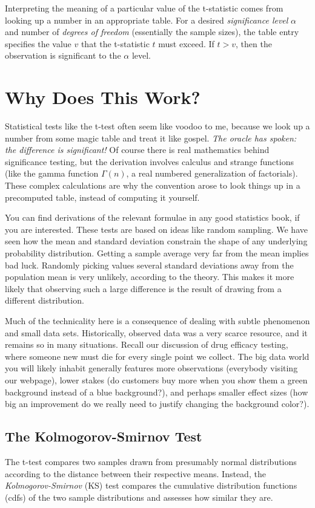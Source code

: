 \documentclass[10pt]{article}
\begin{document}
Interpreting the meaning of a particular value of the t-statistic comes from looking up a number in an appropriate table. For a desired \textit{significance level} $\alpha$ and number of \textit{degrees of freedom} (essentially the sample sizes), the table entry specifies the value $v$ that the t-statistic $t$ must exceed. If $t>v$, then the observation is significant to the $\alpha$ level.

\section{Why Does This Work?}
Statistical tests like the t-test often seem like voodoo to me, because we look up a number from some magic table and treat it like gospel. \textit{The oracle has spoken: the difference is significant!} Of course there is real mathematics behind significance testing, but the derivation involves calculus and strange functions (like the gamma function $\Gamma(n)$, a real numbered generalization of factorials). These complex calculations are why the convention arose to look things up in a precomputed table, instead of computing it yourself.

You can find derivations of the relevant formulae in any good statistics book, if you are interested. These tests are based on ideas like random sampling. We have seen how the mean and standard deviation constrain the shape of any underlying probability distribution. Getting a sample average very far from the mean implies bad luck. Randomly picking values several standard deviations away from the population mean is very unlikely, according to the theory. This makes it more likely that observing such a large difference is the result of drawing from a different distribution.

Much of the technicality here is a consequence of dealing with subtle phenomenon and small data sets. Historically, observed data was a very scarce resource, and it remains so in many situations. Recall our discussion of drug efficacy testing, where someone new must die for every single point we collect. The big data world you will likely inhabit generally features more observations (everybody visiting our webpage), lower stakes (do customers buy more when you show them a green background instead of a blue background?), and perhaps smaller effect sizes (how big an improvement do we really need to justify changing the background color?).

\subsection{The Kolmogorov-Smirnov Test}
The t-test compares two samples drawn from presumably normal distributions according to the distance between their respective means. Instead, the \textit{Kolmogorov-Smirnov} (KS) test compares the cumulative distribution functions (cdfs) of the two sample distributions and assesses how similar they are.
\end{document}

